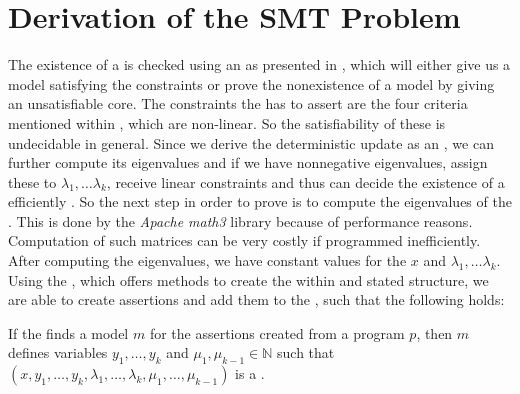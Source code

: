 \section{Derivation of the SMT Problem}
\label{sec:derivation-smt}
The existence of a \gna is checked using an \solver as presented in , which will either give us a model satisfying the constraints or prove the nonexistence of a model by giving an unsatisfiable core. \newline
The constraints the \solver has to assert are the four criteria mentioned within , which are non-linear. So the satisfiability of these is undecidable in general. Since we derive the deterministic update as an \updatematrix, we can further compute its eigenvalues and if we have nonnegative eigenvalues, assign these to $\lambda_1, \dots \lambda_k$, receive linear constraints and thus can decide the existence of a \gna efficiently \cite{leike2014geometric}.%
\newline
So the next step in order to prove \nonterm is to compute the eigenvalues of the \updatematrix. This is done by the \textit{Apache math3} library \cite{ApacheMath3} because of performance reasons. Computation of such matrices can be very costly if programmed inefficiently. %
After computing the eigenvalues, we have constant values for the \stem $x$ and $\lambda_1, \dots \lambda_k$.
\newline
Using the \smtfactory, which offers methods to create the within  and  stated structure, we are able to create assertions and add them to the \solver, such that the following holds:
\begin{lemma}
	If the \solver finds a model $m$ for the assertions created from a program $p$,
	then $m$ defines variables $y_1, \dots, y_k$ and $\mu_1, \mu_{k-1} \in \mathbb{N}$ such that 
	$(x, y_1, \dots, y_k, \lambda_1, \dots, \lambda_k, \mu_1, \dots, \mu_{k-1})$ is a \gna.
\end{lemma}

